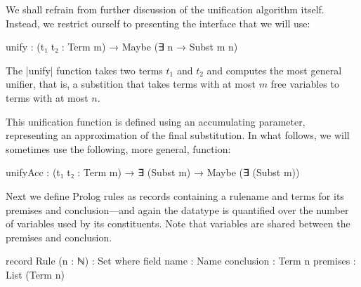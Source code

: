 \documentclass[preprint]{sigplanconf}
\begin{document}

We shall refrain from further discussion of the unification algorithm itself.
Instead, we restrict ourself to presenting the interface that we will use:
\begin{spec}
  unify : (t₁ t₂ : Term m) → Maybe (∃ n → Subst m n)
\end{spec}
The |unify| function takes two terms $t_1$ and $t_2$ and computes the most general
unifier, that is, a substition that takes terms with at most $m$ free
variables to terms with at most $n$.

This unification function is defined using an accumulating parameter,
representing an approximation of the final substitution. In what
follows, we will sometimes use the following, more general, function:
\begin{code}
  unifyAcc : (t₁ t₂ : Term m) →
    ∃ (Subst m) → Maybe (∃ (Subst m))
\end{code}

Next we define Prolog rules as records containing a rulename and terms for its
premises and conclusion---and again the datatype is quantified over the number of
variables used by its constituents. Note that variables are shared between the
premises and conclusion. 

\begin{code}
  record Rule (n : ℕ) : Set where
    field
      name        : Name
      conclusion  : Term n
      premises    : List (Term n)
\end{code}

\end{document}
